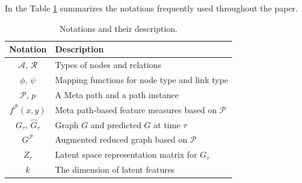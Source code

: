 
In the Table \ref{table_notations} summarizes the notations frequently used throughout the paper. 

\begin{table}[t]
\centering
\caption{Notations and their description.}
\label{table_notations}
\begin{tabular}{|c|l|} 

\hline\textbf{Notation} & \textbf{Description} \\ \hline
$\mathcal{A}$, $\mathcal{R}$  & Types of nodes and relations \\ \hline
$\phi$, $\psi$  & Mapping functions for node type and link type  \\ \hline
$\mathcal{P}$, $p$  & A Meta path and a path instance \\ \hline
$f^{\mathcal{P}}(x,y)$ & Meta path-based feature measures based on $\mathcal{P}$ \\ \hline
$G_\tau$, $\hat{G}_\tau$ & Graph $G$ and predicted $G$ at time $\tau$  \\ \hline
$G^\mathcal{P}$ & Augmented reduced graph based on $\mathcal{P}$ \\ \hline
$Z_\tau$ & Latent space representation matrix for $G_\tau$ \\ \hline
$k$ & The dimension of latent features \\ \hline

\end{tabular}
\end{table}